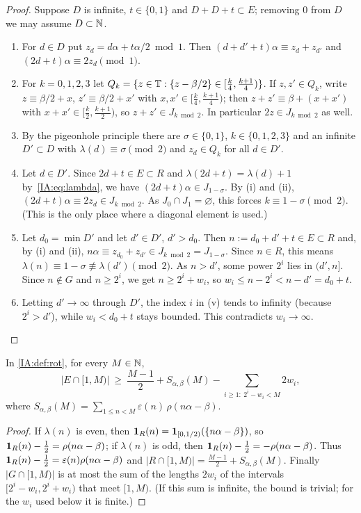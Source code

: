 \begin{proof}
Suppose $D$ is infinite, $t\in\{0,1\}$ and $D+D+t\subset E$; removing $0$ from $D$ we may assume
$D\subset\mathbb{N}$.
\begin{enumerate}[label=(\roman*),leftmargin=*]
\item For $d\in D$ put $z_d=d\alpha+t\alpha/2\bmod1$. Then $(d+d'+t)\alpha\equiv z_d+z_{d'}$ and
$(2d+t)\alpha\equiv2z_d\pmod 1$.
\item For $k=0,1,2,3$ let $Q_k=\{z\in\mathbb{T}:\{z-\beta/2\}\in[\frac k4,\frac{k+1}4)\}$. If $z,z'\in
Q_k$, write $z\equiv\beta/2+x$, $z'\equiv\beta/2+x'$ with $x,x'\in[\frac k4,\frac{k+1}4)$; then
$z+z'\equiv\beta+(x+x')$ with $x+x'\in[\frac k2,\frac{k+1}2)$, so $z+z'\in J_{k\bmod2}$.
In particular $2z\in J_{k\bmod 2}$ as well.
\item By the pigeonhole principle there are $\sigma\in\{0,1\}$, $k\in\{0,1,2,3\}$ and an infinite
$D'\subset D$ with $\lambda(d)\equiv\sigma\pmod 2$ and $z_d\in Q_k$ for all $d\in D'$.
\item Let $d\in D'$. Since $2d+t\in E\subset R$ and $\lambda(2d+t)=\lambda(d)+1$
by~\eqref{IA:eq:lambda}, we have $(2d+t)\alpha\in J_{1-\sigma}$. By (i) and (ii),
$(2d+t)\alpha\equiv2z_d\in J_{k\bmod 2}$. As $J_0\cap J_1=\varnothing$, this forces $k\equiv1-\sigma
\pmod 2$. (This is the only place where a diagonal element is used.)
\item Let $d_0=\min D'$ and let $d'\in D'$, $d'>d_0$. Then $n:=d_0+d'+t\in E\subset R$ and, by (i)
and (ii), $n\alpha\equiv z_{d_0}+z_{d'}\in J_{k\bmod2}=J_{1-\sigma}$. Since $n\in R$, this means
$\lambda(n)\equiv1-\sigma\not\equiv\lambda(d')\pmod 2$. As $n>d'$, some power $2^i$ lies in
$(d',n]$. Since $n\notin G$ and $n\ge 2^i$, we get $n\ge2^i+w_i$, so
$w_i\le n-2^i<n-d'=d_0+t$.
\item Letting $d'\to\infty$ through $D'$, the index $i$ in (v) tends to infinity (because $2^i>d'$),
while $w_i<d_0+t$ stays bounded. This contradicts $w_i\to\infty$.\qedhere
\end{enumerate}
\end{proof}

\begin{lemma}\label{IA:lem:excess}
In \cref{IA:def:rot}, for every $M\in\mathbb{N}$,
\[
|E\cap[1,M)|\ \ge\ \frac{M-1}{2}+S_{\alpha,\beta}(M)-\sum_{i\ge1:\ 2^i-w_i<M}2w_i,
\]
where $S_{\alpha,\beta}(M)=\sum_{1\le n<M}\varepsilon(n)\,\rho(n\alpha-\beta)$.
\end{lemma}

\begin{proof}
If $\lambda(n)$ is even, then $\mathbf{1}_R(n)=\mathbf{1}_{[0,1/2)}(\{n\alpha-\beta\})$, so
$\mathbf{1}_R(n)-\frac12=\rho(n\alpha-\beta)$; if $\lambda(n)$ is odd, then
$\mathbf{1}_R(n)-\frac12=-\rho(n\alpha-\beta)$. Thus $\mathbf{1}_R(n)-\frac12=\varepsilon(n)\rho(n\alpha-\beta)$
and $|R\cap[1,M)|=\frac{M-1}2+S_{\alpha,\beta}(M)$. Finally $|G\cap[1,M)|$ is at most the sum of the
lengths $2w_i$ of the intervals $[2^i-w_i,2^i+w_i)$ that meet $[1,M)$. (If this sum is infinite,
the bound is trivial; for the $w_i$ used below it is finite.)
\end{proof}

